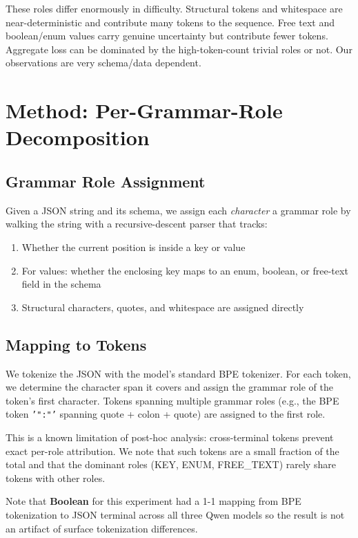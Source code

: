 \documentclass[11pt]{article}
\begin{document}
These roles differ enormously in difficulty. Structural tokens and whitespace are near-deterministic and contribute many tokens to the sequence. Free text and boolean/enum values carry genuine uncertainty but contribute fewer tokens. Aggregate loss can be dominated by the high-token-count trivial roles or not. Our observations are very schema/data dependent.

\section{Method: Per-Grammar-Role Decomposition}

\subsection{Grammar Role Assignment}

Given a JSON string and its schema, we assign each \emph{character} a grammar role by walking the string with a recursive-descent parser that tracks:

\begin{enumerate}
\item Whether the current position is inside a key or value
\item For values: whether the enclosing key maps to an enum, boolean, or free-text field in the schema
\item Structural characters, quotes, and whitespace are assigned directly
\end{enumerate}

\subsection{Mapping to Tokens}

We tokenize the JSON with the model's standard BPE tokenizer. For each token, we determine the character span it covers and assign the grammar role of the token's first character. Tokens spanning multiple grammar roles (e.g., the BPE token \texttt{'":"'} spanning quote + colon + quote) are assigned to the first role.

This is a known limitation of post-hoc analysis: cross-terminal tokens prevent exact per-role attribution. We note that such tokens are a small fraction of the total and that the dominant roles (KEY, ENUM, FREE\_TEXT) rarely share tokens with other roles. 

Note that \textbf{Boolean} for this experiment had a 1-1 mapping from BPE tokenization to JSON terminal across all three Qwen models so the result is not an artifact of surface tokenization differences. 
\end{document}
